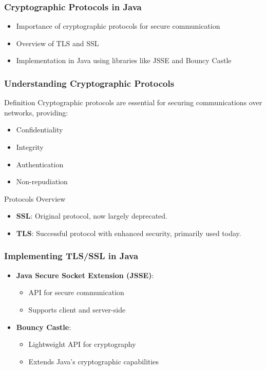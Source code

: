 \documentclass{beamer}
\begin{document}
\begin{frame}
    \frametitle{Cryptographic Protocols in Java}
    \begin{itemize}
        \item Importance of cryptographic protocols for secure communication
        \item Overview of TLS and SSL
        \item Implementation in Java using libraries like JSSE and Bouncy Castle
    \end{itemize}
\end{frame}

\begin{frame}
    \frametitle{Understanding Cryptographic Protocols}
    \begin{block}{Definition}
        Cryptographic protocols are essential for securing communications over networks, providing:
        \begin{itemize}
            \item Confidentiality
            \item Integrity
            \item Authentication
            \item Non-repudiation
        \end{itemize}
    \end{block}
    \begin{block}{Protocols Overview}
        \begin{itemize}
            \item \textbf{SSL}: Original protocol, now largely deprecated.
            \item \textbf{TLS}: Successful protocol with enhanced security, primarily used today.
        \end{itemize}
    \end{block}
\end{frame}

\begin{frame}
    \frametitle{Implementing TLS/SSL in Java}
    \begin{itemize}
        \item \textbf{Java Secure Socket Extension (JSSE)}:
            \begin{itemize}
                \item API for secure communication
                \item Supports client and server-side
            \end{itemize}
        \item \textbf{Bouncy Castle}:
            \begin{itemize}
                \item Lightweight API for cryptography
                \item Extends Java's cryptographic capabilities
            \end{itemize}
    \end{itemize}
\end{frame}
\end{document}
